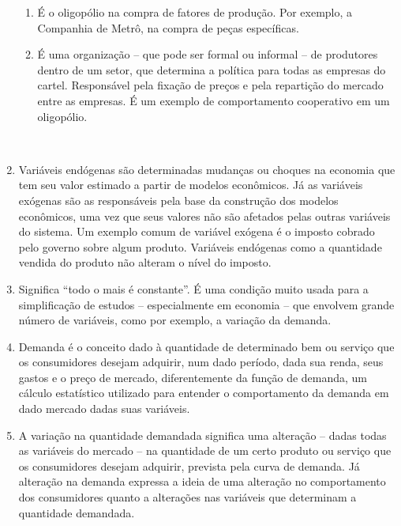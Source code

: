 \documentclass[a4paper, 12pt]{article}
\begin{document}
\begin{enumerate}
\begin{enumerate}
		\item É o oligopólio na compra de fatores de produção. Por exemplo, a Companhia de Metrô, na compra de peças específicas.\\
		
		\item É uma organização – que pode ser formal ou informal – de produtores dentro de um setor, que determina a política para todas as empresas do cartel. Responsável pela fixação de preços e pela repartição do mercado entre as empresas. É um exemplo de comportamento cooperativo em um oligopólio.\\
	\end{enumerate}
	\\

	\item Variáveis endógenas são determinadas mudanças ou choques na economia que tem seu valor estimado a partir de modelos econômicos. Já as variáveis exógenas são as responsáveis pela base da construção dos modelos econômicos, uma vez que seus valores não são afetados pelas outras variáveis do sistema. Um exemplo comum de variável exógena é o imposto cobrado pelo governo sobre algum produto. Variáveis endógenas como a quantidade vendida do produto não alteram o nível do imposto.
	\\

	\item Significa “todo o mais é constante”. É uma condição muito usada para a simplificação de estudos – especialmente em economia – que envolvem grande número de variáveis, como por exemplo, a variação da demanda.
	\\

	\item Demanda é o conceito dado à quantidade de determinado bem ou serviço que os consumidores desejam adquirir, num dado período, dada sua renda, seus gastos e o preço de mercado, diferentemente da função de demanda, um cálculo estatístico utilizado para entender o comportamento da demanda em dado mercado dadas suas variáveis. 
	\\

	\item A variação na quantidade demandada significa uma alteração – dadas todas as variáveis do mercado – na quantidade de um certo produto ou serviço que os consumidores desejam adquirir, prevista pela curva de demanda. Já alteração na demanda expressa a ideia de uma alteração no comportamento dos consumidores quanto a alterações nas variáveis que determinam a quantidade demandada.
	\\
	\newpage
	

\end{enumerate}
\end{document}
